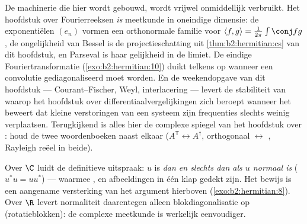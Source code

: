 \begin{remark}
De  machinerie die hier wordt gebouwd, wordt vrijwel
onmiddellijk verbruikt. Het hoofdstuk over Fourierreeksen
\emph{is}  meetkunde in oneindige dimensie: de
exponentiëlen $(e_n)$ vormen een orthonormale familie voor $\langle
f, g\rangle = \frac{1}{2\pi}\int\conj fg$, de ongelijkheid van
Bessel is de projectieschatting uit \cref{thm:b2:hermitian:cs} van
dit hoofdstuk, en Parseval is haar gelijkheid in de limiet. De
eindige Fouriertransformatie (\cref{exo:b2:hermitian:10}) duikt
telkens op wanneer een convolutie gediagonaliseerd moet worden. En
de weekendopgave van dit hoofdstuk --- Courant--Fischer, Weyl,
interlacering --- levert de stabiliteit van  waarop het
hoofdstuk over differentiaalvergelijkingen zich beroept wanneer het
beweert dat kleine verstoringen van een systeem zijn frequenties
slechts weinig verplaatsen. Terugkijkend is alles hier de complexe
spiegel van het hoofdstuk over : houd de twee
woordenboeken naast elkaar ($A^{\mathsf T} \leftrightarrow
A^\dagger$, orthogonaal $\leftrightarrow$ , Rayleigh reëel
in beide).
\end{remark}

\begin{remark}
Over $\C$ luidt de definitieve uitspraak: $u$ is \emph{
 dan en slechts dan als $u$ normaal is} ($u^*u =
uu^*$) --- waarmee ,  en 
afbeeldingen in één klap gedekt zijn. Het bewijs is een aangename
versterking van het argument hierboven
(\cref{exo:b2:hermitian:8}). Over $\R$ levert normaliteit daarentegen
alleen blokdiagonalisatie op (rotatieblokken): de complexe
meetkunde is werkelijk eenvoudiger.
\end{remark}

